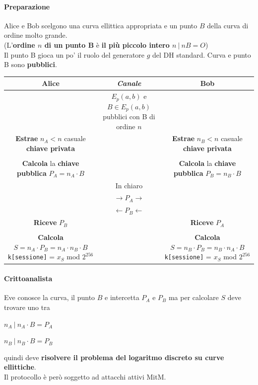 \documentclass[10pt]{book}
\begin{document}
\paragraph{Preparazione} Alice e Bob scelgono una curva ellittica appropriata e un punto $B$ della curva di ordine molto grande.\\ (L'\textbf{ordine $n$ di un punto B} è \textbf{il più piccolo intero $n\:|\:nB = O$})\\
Il punto B gioca un po' il ruolo del generatore $g$ del DH standard. Curva e punto B sono \textbf{pubblici}.
\begin{center}
	\begin{tabular}{c | c | c}
	Alice & \textit{Canale} & Bob\\
	\hline
	& \makecell{$E_p(a,b)$ e $B\in E_p(a,b)$\\pubblici con B di ordine $n$} & \\
	\makecell{\textbf{Estrae}\\$n_A < n$ casuale\\\textbf{chiave privata}} & & \makecell{\textbf{Estrae}\\$n_B < n$ casuale\\\textbf{chiave privata}}\\
	& &\\
	\makecell{\textbf{Calcola} la \textbf{chiave pubblica}\\$P_A = n_A\cdot B$\\}& &\makecell{\textbf{Calcola} la \textbf{chiave pubblica}\\$P_B = n_B\cdot B$\\}\\
	& In chiaro & \\
	& $\rightarrow P_A\rightarrow$ & \\
	& $\leftarrow P_B\leftarrow$ & \\
	\textbf{Riceve} $P_B$ & & \textbf{Riceve} $P_A$\\
	& &\\
	\makecell{\textbf{Calcola}\\$S = n_A\cdot P_B = n_A\cdot n_B\cdot B$\\\texttt{k[sessione]} = $x_S$ mod $2^{256}$} & & \makecell{\textbf{Calcola}\\$S = n_B\cdot P_B = n_B\cdot n_A\cdot B$\\\texttt{k[sessione]} = $x_S$ mod $2^{256}$}
	\end{tabular}
\end{center}
\paragraph{Crittoanalista} Eve conosce la curva, il punto $B$ e intercetta $P_A$ e $P_B$ ma per calcolare $S$ deve trovare uno tra
\begin{list}{}{}
	\item $n_A\:|\:n_A\cdot B = P_A$
	\item $n_B\:|\:n_B\cdot B = P_B$
\end{list}
quindi deve \textbf{risolvere il problema del logaritmo discreto su curve ellittiche}.\\
Il protocollo è però soggetto ad attacchi attivi MitM.
\end{document}
